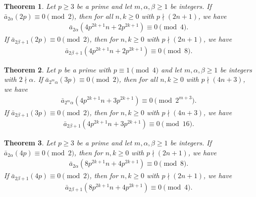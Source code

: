 \documentclass[11pt,a4paper]{article}
\numberwithin{equation}{section}
\theoremstyle{plain}
\newtheorem{theorem}{Theorem}[section]
\begin{document}
	\begin{theorem}\label{t4n2}
		Let $p\ge 3$ be a prime and let $m,\alpha,\beta \ge1$ be integers. If $\bar{a}_{2\alpha}(2p)\equiv 0\pmod 2$, then for all $n,k\ge 0$ with $p\nmid(2n+1)$, we have
		\begin{align*}
			\bar{a}_{2\alpha}\left(4p^{2k+1}n+2p^{2k+1}\right)\equiv 0\pmod {4}.
		\end{align*}
		If $\bar{a}_{2\beta+1}(2p)\equiv 0\pmod 2$, then for $n,k\ge 0$ with $p\nmid(2n+1)$, we have
		\begin{align*}
			\bar{a}_{2\beta+1}\left(4p^{2k+1}n+2p^{2k+1}\right)\equiv 0\pmod {8}.
		\end{align*}
	\end{theorem}
\begin{theorem}\label{t4n3}
 Let $p$ be a prime with $p\equiv 1\pmod 4$ and let $m, \alpha,\beta\ge 1$ be integers with $2\nmid\alpha$. If $\bar{a}_{2^m\alpha}(3p)\equiv 0\pmod 2$, then for all $n,k\ge 0$ with $p\nmid(4n+3)$, we have
 \begin{align*}
 \bar{a}_{2^m\alpha}\left(4p^{2k+1}n+3p^{2k+1}\right)\equiv 0\pmod {2^{m+3}}.
 \end{align*}
 If $\bar{a}_{2\beta+1}(3p)\equiv 0\pmod 2$, then for $n,k\ge 0$ with $p\nmid(4n+3)$, we have
 \begin{align*}
 	\bar{a}_{2\beta+1}\left(4p^{2k+1}n+3p^{2k+1}\right)\equiv 0\pmod {16}.
 \end{align*}
\end{theorem}
	\begin{theorem}\label{t8n4}
		Let $p\ge 3$ be a prime and let $m,\alpha,\beta \ge1$ be integers. If $\bar{a}_{2\alpha}(4p)\equiv 0\pmod 2$, then for $n,k\ge 0$ with $p\nmid(2n+1)$, we have
	\begin{align*}
		\bar{a}_{2\alpha}\left(8p^{2k+1}n+4p^{2k+1}\right)\equiv 0\pmod {8}.
	\end{align*}
	If $\bar{a}_{2\beta+1}(4p)\equiv 0\pmod 2$, then for $n,k\ge 0$ with $p\nmid(2n+1)$, we have
	\begin{align*}
		\bar{a}_{2\beta+1}\left(8p^{2k+1}n+4p^{2k+1}\right)\equiv 0\pmod {4}.
	\end{align*}
\end{theorem}
\end{document}
